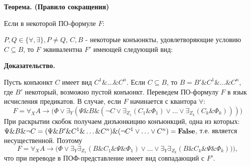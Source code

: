 \documentclass[a4paper,12pt]{article}
\begin{document}
\textbf{Теорема. (Правило сокращения)}

Если в некоторой ПО-формуле $F$:
\begin{center}
\end{center}
$P,Q\in\{\forall,\exists\}, P\neq Q$, $C,B$ - некоторые конъюнкты, удовлетворяющие условию $C\subseteq B$, то $F$ эквивалентна $F'$ имеющей следующий вид:

\begin{center}
\end{center}

\textbf{Доказательство.}

Пусть конъюнкт $C$ имеет вид $C^1\&\ldots\& C^n$. Если $C\subseteq B$, то $B = B'\&C^1\&\ldots\& C^n$, где $B'$ некоторый, возможно пустой конъюнкт. Переведем ПО-формулу $F$ в язык исчисления предикатов. В случае, если $F$ начинается с квантора $\forall$:
$$F = \forall_X A\rightarrow\bigl(\Phi\vee\exists_Y(\Psi\& B\&(\neg C\vee\exists_{Z_1}(C_1\&\Phi_1)\vee\ldots\vee\exists_{Z_k}(C_k\&\Phi_k)))\bigr)$$
При раскрытии скобок получаем дизъюнкицию конъюнкций, одна из которых: $\Psi\&B\&\neg C = (\Psi\&B'\&C^1\&\ldots\& C^n)\&(\neg C^1\vee\ldots\vee C^n) = \text{\textbf{False}}$, т.е. является несущественной. Поэтому
$$F = \forall_X A\rightarrow\bigl(\Phi\vee\exists_Y\exists_{Z_1}(B\&C_1\&\Psi\&\Phi_1)\vee\ldots\vee\exists_Y\exists_{Z_k}(B\&C_k\&\Psi\&\Phi_k))\bigr),$$
что при переводе в ПОФ-представление имеет вид совпадающий с $F'$.
\end{document}
